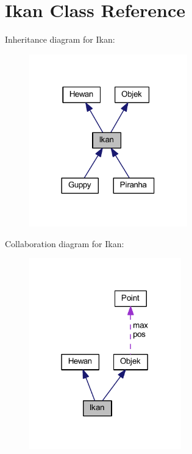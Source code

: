 \hypertarget{class_ikan}{}\section{Ikan Class Reference}
\label{class_ikan}


Inheritance diagram for Ikan\+:\nopagebreak
\begin{figure}[H]
\begin{center}
\leavevmode
\includegraphics[width=194pt]{class_ikan__inherit__graph}
\end{center}
\end{figure}


Collaboration diagram for Ikan\+:\nopagebreak
\begin{figure}[H]
\begin{center}
\leavevmode
\includegraphics[width=187pt]{class_ikan__coll__graph}
\end{center}
\end{figure}
